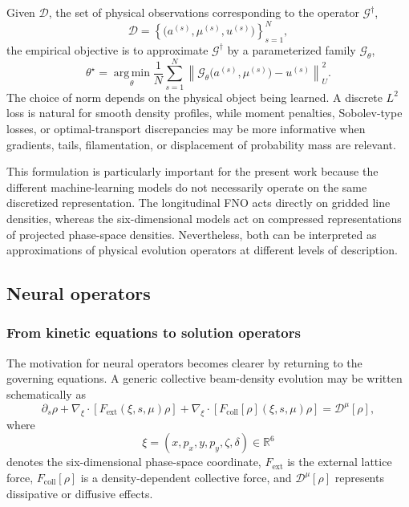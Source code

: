 \documentclass[11pt,a4paper]{article}
\providecommand{\norm}[1]{\left\lVert#1\right\rVert}
\providecommand{\argmin}{\operatorname*{arg\,min}}
\begin{document}
\begin{sloppypar}
Given $\mathcal{D}$, the set of physical observations corresponding to the operator $\mathcal{G}^{\dagger}$,
\begin{equation}
\mathcal{D} =\left\{\bigl(a^{(s)},\mu^{(s)},u^{(s)}\bigr)\right\}_{s=1}^{N},
\end{equation}
the empirical objective is to approximate
$\mathcal{G}^{\dagger}$ by a parameterized family
$\mathcal{G}_{\theta}$,
\begin{equation}
\theta^{\star}
=
\argmin_{\theta}
\frac{1}{N}
\sum_{s=1}^{N}
\norm{
\mathcal{G}_{\theta}
\bigl(a^{(s)},\mu^{(s)}\bigr)
-
u^{(s)}
}_{U}^{2}.
\label{eq:operator_training_revised}
\end{equation}
The choice of norm depends on the physical object being learned. A discrete $L^{2}$ loss is natural for smooth density profiles, while moment penalties, Sobolev-type losses, or optimal-transport discrepancies may be more informative when gradients, tails, filamentation, or displacement of probability mass are relevant.

This formulation is particularly important for the present work because the different machine-learning models do not necessarily operate on the same discretized representation. The longitudinal FNO acts directly on gridded line densities, whereas the six-dimensional models act on compressed representations of projected phase-space densities. Nevertheless, both can be interpreted as approximations of physical evolution operators at different levels of description.

\subsection{Neural operators}
\label{subsec:neural_operators}

\subsubsection{From kinetic equations to solution operators}
\label{subsubsec:pde_solution_operators}

The motivation for neural operators becomes clearer by returning to the governing equations. A generic collective beam-density evolution may be written schematically as
\begin{equation}
\partial_s\rho
+
\nabla_{\xi}\cdot
\left[
F_{\mathrm{ext}}(\xi,s,\mu)\rho
\right]
+
\nabla_{\xi}\cdot
\left[
F_{\mathrm{coll}}[\rho](\xi,s,\mu)\rho
\right]
=
\mathcal{D}^{\mu}[\rho],
\label{eq:NO_generic_beam_pde}
\end{equation}
where
\begin{equation}
\xi
=
(x,p_x,y,p_y,\zeta,\delta)
\in\mathbb{R}^{6}
\end{equation}
denotes the six-dimensional phase-space coordinate,
$F_{\mathrm{ext}}$ is the external lattice force,
$F_{\mathrm{coll}}[\rho]$ is a density-dependent collective force,
and $\mathcal{D}^{\mu}[\rho]$ represents dissipative or diffusive effects.


\end{sloppypar}
\end{document}
